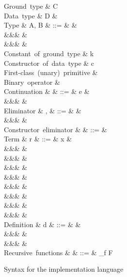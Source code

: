 \begin{figure}
\begin{syntaxfig}
\mbox{Ground type}
&
C
\\[2mm]
\mbox{Data type}
&
D
&
\\[2mm]
\mbox{Type}
&
A, B
&
::=
&
&
\\
&&&
&
\\
&&&
&
\\[2mm]
\mbox{Constant of ground type}
&
k
\\
\mbox{Constructor of data type}
&
c
\\
\mbox{First-class (unary) primitive}
&
\phi
\\
\mbox{Binary operator}
&
\primOp
\\[2mm]
\mbox{Continuation}
&
\kappa
&
::=
&
e
&
\\
&&&
\sigma
&
\\[2mm]
\mbox{Eliminator}
&
\sigma, \tau
&
::=
&
&
\\
&&&
\elimConstr{\Sigma}
&
\\[2mm]
\mbox{Constructor eliminator}
&
\Sigma
&
::=
&
\\[2mm]
\mbox{Term}
&
r
&
::=
&
x
&
\\
&&&
&
\\
&&&
\phi
&
\\
&&&
\exFun{\sigma}
&
\\
&&&
&
\\
&&&
&
\\
&&&
&
\\
&&&
&
\\
&&&
&
\\[2mm]
\mbox{Definition}
&
d
&
::=
&
&
\\
&&&
\exLetrecDef{\delta}
&
\\
&&&
&
\\[2mm]
\mbox{Recursive functions}
&
\delta
&
::=
&
_{f \in F}
\end{syntaxfig}
\caption{Syntax for the implementation language}
\label{fig:impl-language:syntax}
\end{figure}
